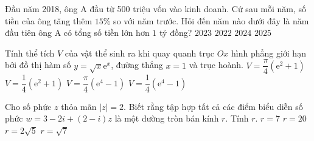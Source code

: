   \begin{ex}%
	Đầu năm 2018, ông A đầu từ 500 triệu vốn vào kinh doanh. Cứ sau mỗi năm, số tiền của ông tăng thêm $15\%$ so với năm trước. Hỏi đến năm nào dưới đây là năm đầu tiên ông A có tổng số tiền lớn hơn $1$ tỷ đồng?
	\choice
	{\True $2023 $}
	{$2022 $}
	{$2024 $}
	{$2025 $}
	
\end{ex}

  \begin{ex}%
	Tính thể tích $V$ của vật thể sinh ra khi quay quanh trục $Ox$ hình phẳng giới hạn bởi đồ thị hàm số $y=\sqrt{x}\mathrm{e}^x$, đường thẳng $x=1$ và trục hoành.
	\choice
	{\True $V=\dfrac{\pi}{4}(\mathrm{e}^2+1) $}
	{$V=\dfrac{1}{4}(\mathrm{e}^2+1) $}
	{$V=\dfrac{\pi}{4}(\mathrm{e}^4-1) $}
	{$V=\dfrac{1}{4}(\mathrm{e}^4-1) $}
	
\end{ex}

  \begin{ex}%
	Cho số phức $z$ thỏa mãn $|z|=2$. Biết rằng tập hợp tất cả các điểm biểu diễn số phức $w=3-2i+(2-i)z$ là một đường tròn bán kính $r$. Tính $r$.
	\choice
	{$r=7 $}
	{$r=20 $}
	{\True $r=2\sqrt{5} $}
	{$r=\sqrt{7} $}
	
\end{ex}

